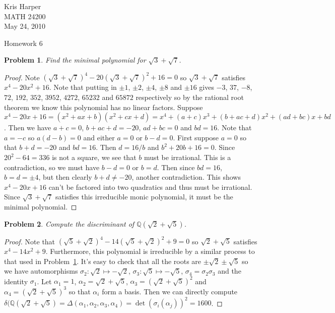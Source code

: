 \documentclass{article}
\newtheorem{problem}{Problem}
\begin{document}
\begin{flushright}
Kris Harper\\

MATH 24200\\

May 24, 2010
\end{flushright}

\begin{center}
Homework 6
\end{center}

\begin{problem}
\label{min}
Find the minimal polynomial for $\sqrt{3} + \sqrt{7}$.
\end{problem}
\begin{proof}
Note $(\sqrt{3}+\sqrt{7})^4 - 20(\sqrt{3} + \sqrt{7})^2 + 16 = 0$ so $\sqrt{3} + \sqrt{7}$ satisfies $x^4 - 20x^2 + 16$. Note that putting in $\pm 1$, $\pm 2$, $\pm 4$, $\pm 8$ and $\pm 16$ gives $-3$, $37$, $-8$, $72$, $192$, $352$, $3952$, $4272$, $65232$ and $65872$ respectively so by the rational root theorem we know this polynomial has no linear factors. Suppose $x^4 - 20x + 16 = (x^2 + ax + b)(x^2 + cx + d) = x^4 + (a + c)x^3 + (b + ac + d)x^2 + (ad + bc)x + bd$. Then we have $a + c = 0$, $b + ac + d = -20$, $ad + bc = 0$ and $bd = 16$. Note that $a = -c$ so $a(d-b) = 0$ and either $a = 0$ or $b - d = 0$. First suppose $a = 0$ so that $b + d = -20$ and $bd = 16$. Then $d = 16/b$ and $b^2 + 20 b + 16 = 0$. Since $20^2 - 64 = 336$ is not a square, we see that $b$ must be irrational. This is a contradiction, so we must have $b-d = 0$ or $b = d$. Then since $bd = 16$, $b = d = \pm 4$, but then clearly $b + d \neq -20$, another contradiction. This shows $x^4 - 20x + 16$ can't be factored into two quadratics and thus must be irrational. Since $\sqrt{3} + \sqrt{7}$ satisfies this irreducible monic polynomial, it must be the minimal polynomial.
\end{proof}

\begin{problem}
Compute the discriminant of $\mathbb{Q}(\sqrt{2} + \sqrt{5})$.
\end{problem}
\begin{proof}
Note that $(\sqrt{5}+\sqrt{2})^4 - 14(\sqrt{5}+\sqrt{2})^2+9 = 0$ so $\sqrt{2} + \sqrt{5}$ satisfies $x^4 - 14x^2 + 9$. Furthermore, this polynomial is irreducible by a similar process to that used in Problem~\ref{min}. It's easy to check that all the roots are $\pm \sqrt{2} \pm \sqrt{5}$ so we have automorphisms $\sigma_2 : \sqrt{2} \mapsto -\sqrt{2}$, $\sigma_3 : \sqrt{5} \mapsto -\sqrt{5}$, $\sigma_4 = \sigma_2\sigma_3$ and the identity $\sigma_1$. Let $\alpha_1 = 1$, $\alpha_2 = \sqrt{2} + \sqrt{5}$, $\alpha_3 = (\sqrt{2} + \sqrt{5})^2$ and $\alpha_4 = (\sqrt{2} + \sqrt{5})^3$ so that $\alpha_i$ form a basis. Then we can directly compute $\delta(\mathbb{Q}(\sqrt{2}+\sqrt{5}) = \Delta(\alpha_1, \alpha_2, \alpha_3, \alpha_4) = \det(\sigma_i(\alpha_j))^2 = 1600$.
\end{proof}
\end{document}
